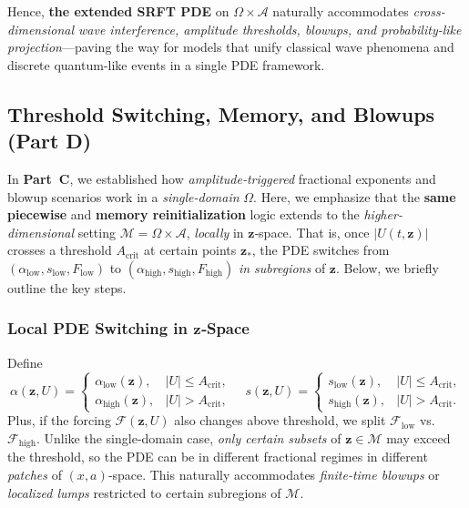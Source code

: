 \documentclass[12pt]{article}
\begin{document}
Hence, \textbf{the extended SRFT PDE} on $\Omega\times\mathcal{A}$ naturally accommodates 
\emph{cross-dimensional wave interference, amplitude thresholds, blowups, and 
probability-like projection}---paving the way for models that unify classical wave 
phenomena and discrete quantum-like events in a single PDE framework.

\subsection{Threshold Switching, Memory, and Blowups (Part D)}
\label{sec:thresholds_d}

In \textbf{Part~C}, we established how \emph{amplitude‐triggered} fractional exponents 
and blowup scenarios work in a \emph{single-domain} \(\Omega\). 
Here, we emphasize that the \textbf{same piecewise} and \textbf{memory reinitialization} 
logic extends to the \emph{higher‐dimensional} setting \(\mathcal{M}=\Omega\times\mathcal{A}\), 
\emph{locally} in \(\mathbf{z}\)‐space. That is, once \(\lvert U(t,\mathbf{z})\rvert\) 
crosses a threshold \(A_{\mathrm{crit}}\) at certain points \(\mathbf{z}_*\), the PDE 
switches from $(\alpha_{\mathrm{low}},s_{\mathrm{low}},F_{\mathrm{low}})$ to 
$(\alpha_{\mathrm{high}},s_{\mathrm{high}},F_{\mathrm{high}})$ \emph{in subregions} of 
\(\mathbf{z}\). Below, we briefly outline the key steps.

\subsubsection{Local PDE Switching in \texorpdfstring{\(\mathbf{z}\)‐Space}{z-space}}
\label{subsubsec:localPDEswitch_zspace}

Define
\[
\alpha(\mathbf{z},U) 
=
\begin{cases}
\alpha_{\mathrm{low}}(\mathbf{z}), & \lvert U\rvert \le A_{\mathrm{crit}},\\[4pt]
\alpha_{\mathrm{high}}(\mathbf{z}), & \lvert U\rvert > A_{\mathrm{crit}},
\end{cases}
\quad
s(\mathbf{z},U)
=
\begin{cases}
s_{\mathrm{low}}(\mathbf{z}), & \lvert U\rvert \le A_{\mathrm{crit}},\\[4pt]
s_{\mathrm{high}}(\mathbf{z}), & \lvert U\rvert > A_{\mathrm{crit}}.
\end{cases}
\]
Plus, if the forcing $\mathcal{F}(\mathbf{z},U)$ also changes above threshold, we split 
$\mathcal{F}_{\mathrm{low}}$ vs.\ $\mathcal{F}_{\mathrm{high}}$. Unlike the single-domain 
case, \emph{only certain subsets} of $\mathbf{z}\in\mathcal{M}$ may exceed the threshold, 
so the PDE can be in different fractional regimes in different \emph{patches} of 
$(x,a)$‐space. This naturally accommodates \emph{finite-time blowups} or \emph{localized 
lumps} restricted to certain subregions of $\mathcal{M}$.
\end{document}
